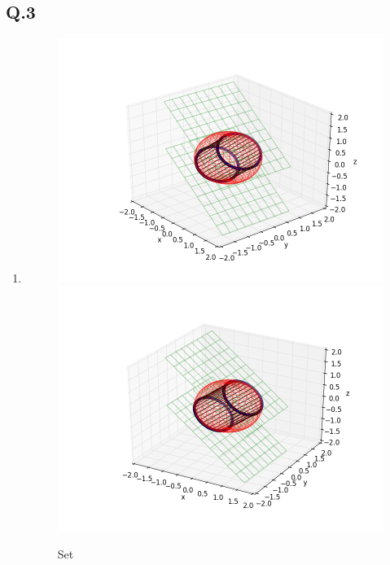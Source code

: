 \documentclass[12pt]{article}\usepackage[]{graphicx}\usepackage[]{color}
\newcommand{\Q}[1]{\subsection*{Q.#1}}
\newenvironment{question}[1]
{\Q{#1}}{}
\begin{document}
\begin{question}{3}
  \begin{enumerate}
  \item 

    \begin{figure}[ht]
      \centering
      \includegraphics[scale=0.4]{nucnormset1.png}
      \includegraphics[scale=0.4]{nucnormset2.png}
      \caption{\label{fig:q3} Set}
    \end{figure}


\end{enumerate}
\end{question}
\end{document}
